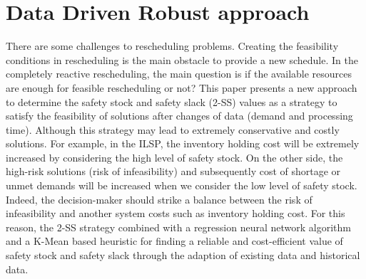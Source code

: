 \documentclass[letterpaper]{article} %
\begin{document}
\section{Data Driven Robust approach}
There are some challenges to rescheduling problems. Creating the feasibility conditions in rescheduling is the main obstacle to provide a new schedule. In the completely reactive rescheduling, the main question is if the available resources are enough for feasible rescheduling or not? This paper presents a new approach to determine the safety stock and safety slack (2-SS) values as a strategy to satisfy the feasibility of solutions after changes of data (demand and processing time). Although this strategy may lead to extremely conservative and costly solutions. For example, in the ILSP, the inventory holding cost will be extremely increased by considering the high level of safety stock. On the other side, the high-risk solutions (risk of infeasibility) and subsequently cost of shortage or unmet demands will be increased when we consider the low level of safety stock. Indeed, the decision-maker should strike a balance between the risk of infeasibility and another system costs such as inventory holding cost. For this reason, the 2-SS strategy combined with a regression neural network algorithm and a K-Mean based heuristic for finding a reliable and cost-efficient value of safety stock and safety slack through the adaption of existing data and historical data. 
\end{document}
